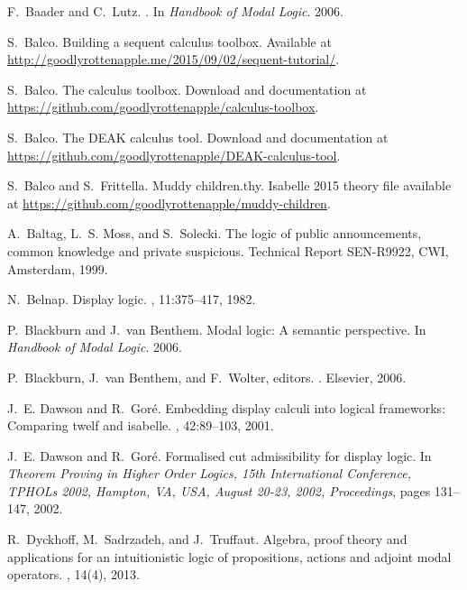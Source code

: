 \documentclass[runningheads,a4paper]{llncs}
\begin{document}
\begin{thebibliography}{10}

F.~Baader and C.~Lutz.
.
\newblock In {\em Handbook of Modal Logic}. 2006.

S.~Balco.
\newblock Building a sequent calculus toolbox.
\newblock Available at
  \url{http://goodlyrottenapple.me/2015/09/02/sequent-tutorial/}.

S.~Balco.
\newblock The calculus toolbox.
\newblock Download and documentation at
  \url{https://github.com/goodlyrottenapple/calculus-toolbox}.

S.~Balco.
\newblock The {DEAK} calculus tool.
\newblock Download and documentation at
  \url{https://github.com/goodlyrottenapple/DEAK-calculus-tool}.

S.~Balco and S.~Frittella.
\newblock Muddy children.thy.
\newblock Isabelle 2015 theory file available at
  \url{https://github.com/goodlyrottenapple/muddy-children}.

A.~Baltag, L.~S. Moss, and S.~Solecki.
\newblock The logic of public announcements, common knowledge and private
  suspicious.
\newblock Technical Report SEN-R9922, CWI, Amsterdam, 1999.

N.~Belnap.
\newblock Display logic.
, 11:375--417, 1982.

P.~Blackburn and J.~van Benthem.
\newblock Modal logic: A semantic perspective.
\newblock In {\em Handbook of Modal Logic}. 2006.

P.~Blackburn, J.~van Benthem, and F.~Wolter, editors.
.
\newblock Elsevier, 2006.

J.~E. Dawson and R.~Gor{\'{e}}.
\newblock Embedding display calculi into logical frameworks: Comparing twelf
  and isabelle.
, 42:89--103, 2001.

J.~E. Dawson and R.~Gor{\'{e}}.
\newblock Formalised cut admissibility for display logic.
\newblock In {\em Theorem Proving in Higher Order Logics, 15th International
  Conference, TPHOLs 2002, Hampton, VA, USA, August 20-23, 2002, Proceedings},
  pages 131--147, 2002.

R.~Dyckhoff, M.~Sadrzadeh, and J.~Truffaut.
\newblock Algebra, proof theory and applications for an intuitionistic logic of
  propositions, actions and adjoint modal operators.
, 14(4), 2013.


\end{thebibliography}
\end{document}
